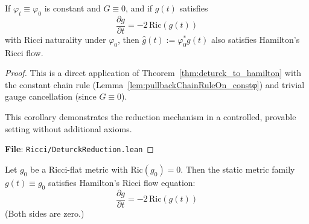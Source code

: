 \begin{corollary}
\label{cor:deturck_to_hamilton_constφ_noGauge}
\leanok
{}
If $\varphi_t \equiv \varphi_0$ is constant and $G \equiv 0$, and if $g(t)$ satisfies
\[ \frac{\partial g}{\partial t} = -2\,\mathrm{Ric}(g(t)) \]
with Ricci naturality under $\varphi_0$, then $\hat{g}(t) := \varphi_0^* g(t)$ also satisfies Hamilton's Ricci flow.
\end{corollary}

\begin{proof}
\leanok
{}
This is a direct application of Theorem~\ref{thm:deturck_to_hamilton} with the constant chain rule (Lemma~\ref{lem:pullbackChainRuleOn_constφ}) and trivial gauge cancellation (since $G \equiv 0$).

This corollary demonstrates the reduction mechanism in a controlled, provable setting without additional axioms.

\textbf{File}: \texttt{Ricci/DeturckReduction.lean}
\end{proof}

\begin{corollary}
\label{cor:deturck_to_hamilton_id_ricciFlat}
\leanok
{}
Let $g_0$ be a Ricci-flat metric with $\mathrm{Ric}(g_0) = 0$. Then the static metric family $g(t) \equiv g_0$ satisfies Hamilton's Ricci flow equation:
\[ \frac{\partial g}{\partial t} = -2\,\mathrm{Ric}(g(t)) \]
(Both sides are zero.)
\end{corollary}


